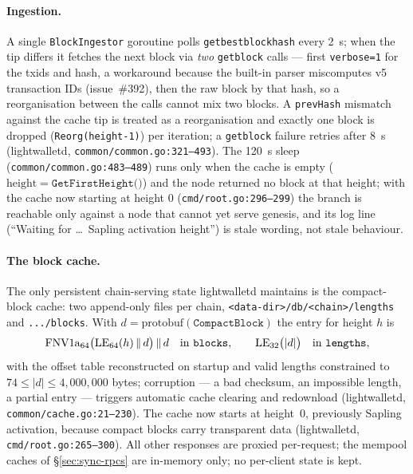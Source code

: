 \documentclass[11pt,a4paper]{article}
\theoremstyle{definition}
\begin{document}
\paragraph{Ingestion.} A single \texttt{BlockIngestor} goroutine polls
\texttt{getbestblockhash} every 2~s; when the tip differs it fetches the
next block via \emph{two} \texttt{getblock} calls --- first
\texttt{verbose=1} for the txids and hash, a workaround because the
built-in parser miscomputes v5 transaction IDs (issue~\#392), then the
raw block by that hash, so a reorganisation between the calls cannot mix
two blocks. A \texttt{prevHash} mismatch against the cache tip is treated
as a reorganisation and exactly one block is dropped
(\texttt{Reorg(height-1)}) per iteration; a \texttt{getblock} failure
retries after 8~s (\textsf{lightwalletd},
\texttt{common/common.go:321--493}). The 120~s sleep
(\texttt{common/common.go:483--489}) runs only when the cache is empty
($\mathrm{height} = \texttt{GetFirstHeight()}$) and the node returned no
block at that height; with the cache now starting at height 0
(\texttt{cmd/root.go:296--299}) the branch is reachable only against a
node that cannot yet serve genesis, and its log line (``Waiting for
\ldots\ Sapling activation height'') is stale wording, not stale
behaviour.

\paragraph{The block cache.} The only persistent chain-serving state
lightwalletd
maintains is the compact-block cache: two append-only files per chain,
\texttt{<data-dir>/db/<chain>/lengths} and \texttt{.../blocks}. With
$d = \mathrm{protobuf}(\mathtt{CompactBlock})$ the entry for height $h$
is
\[
\mathrm{FNV1a}_{64}\bigl(\mathrm{LE}_{64}(h) \,\|\, d\bigr) \,\|\, d
\quad\text{in \texttt{blocks}},\qquad
\mathrm{LE}_{32}\bigl(|d|\bigr) \quad\text{in \texttt{lengths}},
\]
with the offset table reconstructed on startup and valid lengths
constrained to $74 \le |d| \le 4{,}000{,}000$ bytes; corruption --- a bad
checksum, an impossible length, a partial entry --- triggers automatic
cache clearing and redownload (\textsf{lightwalletd},
\texttt{common/cache.go:21--230}). The cache now starts at height~0,
previously Sapling activation, because compact blocks carry transparent
data (\textsf{lightwalletd}, \texttt{cmd/root.go:265--300}). All other
responses are proxied per-request; the mempool caches of
\S\ref{sec:sync-rpcs} are in-memory only; no per-client state is kept.
\end{document}
